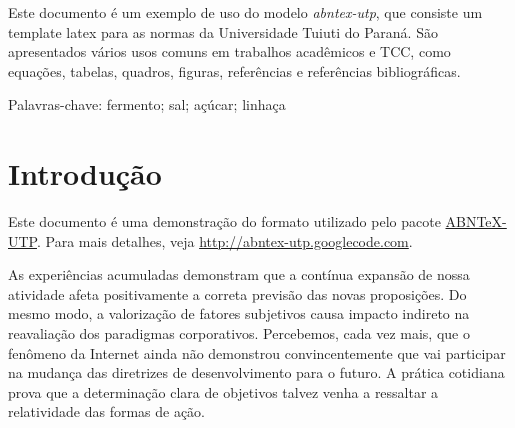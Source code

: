 \documentclass[font=plain,chapter=TITLE,section=Title,espaco=duplo,tocpage=plain,appendix=Name,floatnumber=continuous]{abnt}
\begin{document}


%
%
\UTPCapa
\UTPFalsaFolhaDeRosto
\UTPFolhaDeRosto

\begin{resumo}
Este documento é um exemplo de uso do modelo \emph{abntex-utp}, que
consiste um template latex para as normas da Universidade Tuiuti do Paraná.
São apresentados vários usos comuns em trabalhos acadêmicos e TCC, como
equações, tabelas, quadros, figuras, referências e referências
bibliográficas.

Palavras-chave: fermento; sal; açúcar; linhaça
\end{resumo}

%
%
\listoffigures
\listoftables
\listadequadros
\sumario

%
%
%

\chapter{Introdução}

Este documento é uma demonstração do formato utilizado pelo pacote
\href{http://abntex-utp.googlecode.com}{ABNTeX-UTP}. Para mais detalhes,
veja \url{http://abntex-utp.googlecode.com}.

As experiências acumuladas demonstram que a contínua expansão de nossa
atividade afeta positivamente a correta previsão das novas proposições. Do
mesmo modo, a valorização de fatores subjetivos causa impacto indireto na
reavaliação dos paradigmas corporativos. Percebemos, cada vez mais, que o
fenômeno da Internet ainda não demonstrou convincentemente que vai
participar na mudança das diretrizes de desenvolvimento para o futuro. A
prática cotidiana prova que a determinação clara de objetivos talvez venha
a ressaltar a relatividade das formas de ação. 
\end{document}
